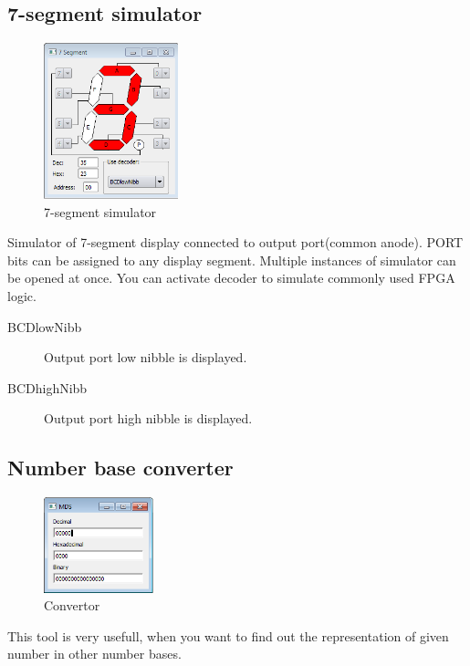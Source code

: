 \subsection{7-segment simulator}
    \begin{figure}
        \centering{}
        \includegraphics[width=110pt]{img/7seg_sim.png}
        \caption{7-segment simulator}
    \end{figure}
    Simulator of 7-segment display connected to output port(common anode). PORT bits can be assigned to any display segment. Multiple instances of simulator can be opened at once.
    You can activate decoder to simulate commonly used FPGA logic.
    \begin{description}
        \item[BCDlowNibb] Output port low nibble is displayed.
        \item[BCDhighNibb] Output port high nibble is displayed.
    \end{description}

\subsection{Number base converter}
    \begin{figure}
            \centering
            \includegraphics[width=90pt]{img/convertor.png}
            \caption{Convertor}
    \end{figure}
    This tool is very usefull, when you want to find out the representation of given number in other number bases.
